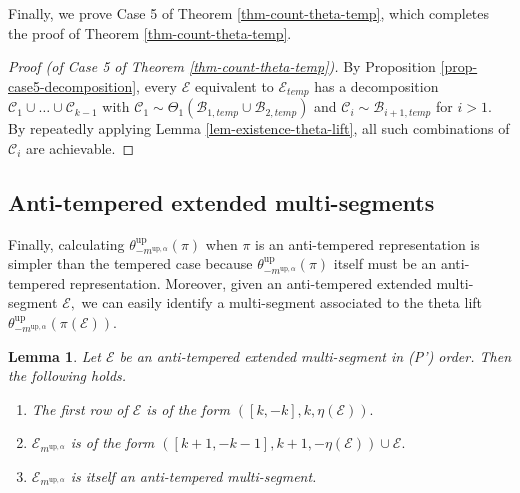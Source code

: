 \documentclass[11pt,letterpaper]{amsart}
\newcommand{\up}{{\mathrm{up}}}
\newcommand{\BB}{\mathcal{B}}
\newcommand{\CC}{\mathcal{C}}
\newcommand{\EE}{\mathcal{E}}
\newtheorem{lemma}[thm]{Lemma}
\numberwithin{equation}{section}
\begin{document}
Finally, we prove Case 5 of Theorem \ref{thm-count-theta-temp}, which completes the proof of Theorem \ref{thm-count-theta-temp}.

\begin{proof}[Proof (of Case 5 of Theorem \ref{thm-count-theta-temp})]
    By Proposition \ref{prop-case5-decomposition}, every $\EE$ equivalent to $\EE_{temp}$ has a decomposition $\CC_1 \cup \dots \cup \CC_{k-1}$ with $\CC_1 \sim \Theta_1(\BB_{1, temp} \cup \BB_{2, temp})$ and $\CC_i \sim \BB_{i+1, temp}$ for $i > 1$. By repeatedly applying Lemma \ref{lem-existence-theta-lift}, all such combinations of $\CC_i$ are achievable.
\end{proof}

\subsection{Anti-tempered extended multi-segments}\label{sec Anti-Tempered Extended Multi-Segments}

Finally, calculating $\theta_{-m^{\up, \alpha}}^\up(\pi)$ when $\pi$ is an anti-tempered representation is simpler than the tempered case because $\theta_{-m^{\up, \alpha}}^\up(\pi)$ itself must be an anti-tempered representation. Moreover, given an anti-tempered extended multi-segment $\mathcal{E},$ we can easily identify a multi-segment associated to the theta lift $\theta_{-m^{\up, \alpha}}^\up(\pi(\mathcal{E})).$

\begin{lemma}
\label{theta-antitempered}
    Let $\mathcal{E}$ be an anti-tempered extended multi-segment in (P') order. Then the following holds.

    \begin{enumerate}
        \item The first row of $\mathcal{E}$ is of the form $([k, -k], k, \eta(\mathcal{E})).$
        \item $\mathcal{E}_{m^{\up, \alpha}}$ is of the form $([k + 1, -k - 1], k + 1, -\eta(\mathcal{E})) \cup \mathcal{E}.$
        \item $\mathcal{E}_{m^{\up, \alpha}}$ is itself an anti-tempered multi-segment.
    \end{enumerate}
\end{lemma}
\end{document}
